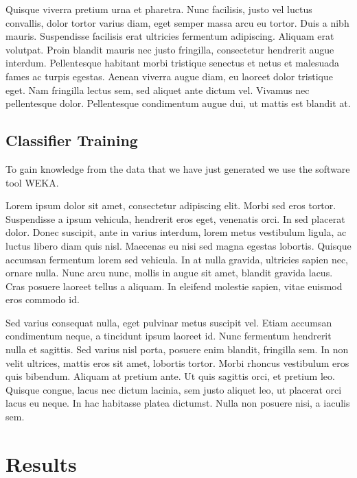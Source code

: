 \documentclass[preprint,5p,times,twocolumn]{elsarticle}
\begin{document}
Quisque viverra pretium urna et pharetra. Nunc facilisis, justo vel luctus
convallis, dolor tortor varius diam, eget semper massa arcu eu tortor. Duis a
nibh mauris. Suspendisse facilisis erat ultricies fermentum adipiscing. Aliquam
erat volutpat. Proin blandit mauris nec justo fringilla, consectetur hendrerit
augue interdum. Pellentesque habitant morbi tristique senectus et netus et
malesuada fames ac turpis egestas. Aenean viverra augue diam, eu laoreet dolor
tristique eget. Nam fringilla lectus sem, sed aliquet ante dictum vel. Vivamus
nec pellentesque dolor. Pellentesque condimentum augue dui, ut mattis est
blandit at.

\subsection{Classifier Training}
\label{process:training}

To gain knowledge from the data that we have just generated we use the software tool WEKA\cite{Hall2009}.

Lorem ipsum dolor sit amet, consectetur adipiscing elit. Morbi sed eros tortor.
Suspendisse a ipsum vehicula, hendrerit eros eget, venenatis orci. In sed
placerat dolor. Donec suscipit, ante in varius interdum, lorem metus vestibulum
ligula, ac luctus libero diam quis nisl. Maecenas eu nisi sed magna egestas
lobortis. Quisque accumsan fermentum lorem sed vehicula. In at nulla gravida,
ultricies sapien nec, ornare nulla. Nunc arcu nunc, mollis in augue sit amet,
blandit gravida lacus. Cras posuere laoreet tellus a aliquam. In eleifend
molestie sapien, vitae euismod eros commodo id.

Sed varius consequat nulla, eget pulvinar metus suscipit vel. Etiam accumsan
condimentum neque, a tincidunt ipsum laoreet id. Nunc fermentum hendrerit nulla
et sagittis. Sed varius nisl porta, posuere enim blandit, fringilla sem. In non
velit ultrices, mattis eros sit amet, lobortis tortor. Morbi rhoncus vestibulum
eros quis bibendum. Aliquam at pretium ante. Ut quis sagittis orci, et pretium
leo. Quisque congue, lacus nec dictum lacinia, sem justo aliquet leo, ut
placerat orci lacus eu neque. In hac habitasse platea dictumst. Nulla non
posuere nisi, a iaculis sem.

\section{Results}
\label{results}
\end{document}
